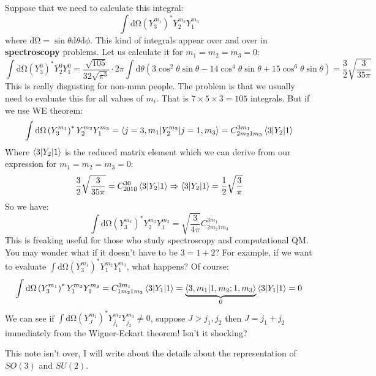 \documentclass{article}
\begin{document}
	Suppose that we need to calculate this integral:
	\begin{equation*}
		\int \mathrm{d} \si{\ohm}\left( Y_{3}^{m_{1}}\right)^{*} Y_{2}^{m_{2}} Y_{1}^{m_{3}}
	\end{equation*}
	where $\mathrm{d} \si{\ohm}=\sin \theta \mathrm{d} \theta \mathrm{d} \phi $. This kind of integrals appear over and over in \textbf{spectroscopy} problems. Let us calculate it for $m_{1} =m_{2} =m_{3} =0$:
	\begin{equation*}
		\int \mathrm{d} \si{\ohm}\left( Y_{3}^{0}\right)^{*} Y_{2}^{0} Y_{1}^{0} =\frac{\sqrt{105}}{32\sqrt{\pi ^{3}}} \cdot 2\pi \int \mathrm{d} \theta \left( 3\cos^{2} \theta \sin \theta -14\cos^{4} \theta \sin \theta +15\cos^{6} \theta \sin \theta \right) =\frac{3}{2}\sqrt{\frac{3}{35\pi }}
	\end{equation*}
	This is really disgusting for non-mma people. The problem is that we usually need to evaluate this for all values of $m_{i} .$ That is $7\times 5\times 3=105$ integrals. But if we use WE theorem:
	\begin{equation*}
		\int \mathrm{d} \si{\ohm}\left( Y_{3}^{m_{1}}\right)^{*} Y_{2}^{m_{2}} Y_{1}^{m_{3}} =\mel**{j=3,m_{1}}{Y_{2}^{m_{2}}}{j=1,m_{3}} =C_{2m_{2} 1m_{3}}^{3m_{1}}\mel**{3}{Y_{2}}{1}
	\end{equation*}
	Where $\mel**{3}{Y_{2}}{1}$ is the reduced matrix element which we can derive from our expression for $m_{1} =m_{2} =m_{3} =0:$
	\begin{equation*}
		\frac{3}{2}\sqrt{\frac{3}{35\pi }} =C_{2010}^{30}\mel**{3}{Y_{2}}{1} \Rightarrow \mel**{3}{Y_{2}}{1} =\frac{1}{2}\sqrt{\frac{3}{\pi }}
	\end{equation*}
	So we have:
	\begin{equation*}
		\int \mathrm{d} \si{\ohm}\left( Y_{3}^{m_{1}}\right)^{*} Y_{2}^{m_{2}} Y_{1}^{m_{3}} =\sqrt{\frac{3}{4\pi }} C_{2m_{2} 1m_{3}}^{3m_{1}}
	\end{equation*}
	This is freaking useful for those who study spectroscopy and computational QM. You may wonder what if it doesn't have to be $3=1+2$? For example, if we want to evaluate $\int \mathrm{d} \si{\ohm}\left( Y_{3}^{m_{1}}\right)^{*} Y_{1}^{m_{2}} Y_{1}^{m_{3}}$, what happens? Of course:
	\begin{equation*}
		\int \mathrm{d} \si{\ohm}\left( Y_{3}^{m_{1}}\right)^{*} Y_{1}^{m_{2}} Y_{1}^{m_{3}} =C_{1m_{2} 1m_{3}}^{3m_{1}}\mel**{3}{Y_{1}}{1} =\underbrace{\bra{3,m_{1}}\ket{1,m_{2} ;1,m_{3}}}_{0}\mel**{3}{Y_{1}}{1} =0
	\end{equation*}
	We can see if $\int \mathrm{d} \si{\ohm}\left( Y_{J}^{m_{1}}\right)^{*} Y_{j_{1}}^{m_{2}} Y_{j_{2}}^{m_{3}} \neq 0$, suppose $J >j_{1} ,j_{2}$ then $J=j_{1} +j_{2}$ immediately from the Wigner-Eckart theorem! Isn't it shocking? 
	
	
	
	
	
	
	
	
	
	This note isn't over, I will write about the details about the representation of $SO( 3)$ and $SU( 2)$. 
	
\end{document}
